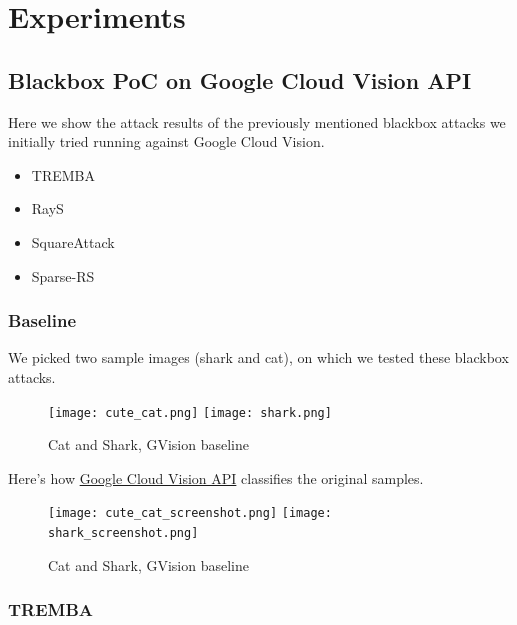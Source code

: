 \chapter{Experiments}
\label{experiments_chap}

\section{Blackbox PoC on Google Cloud Vision API}
Here we show the attack results of the previously mentioned blackbox attacks we initially tried running against Google Cloud Vision.

\begin{itemize}
    \item TREMBA
    \item RayS
    \item SquareAttack
    \item Sparse-RS
\end{itemize}

\subsection{Baseline}
We picked two sample images (shark and cat), on which we tested these blackbox attacks.

\begin{figure}[!htb]
\null\hspace{1cm}
  \texttt{[image: cute\_cat.png]}
\endminipage
\null\hspace{1cm}
  \texttt{[image: shark.png]}
\endminipage
\caption{Cat and Shark, GVision baseline}
\label{fig:cat_shark_original}
\end{figure}


Here's how \href{https://cloud.google.com/vision}{Google Cloud Vision API} classifies the original samples.

\begin{figure}[!htb]
  \texttt{[image: cute\_cat\_screenshot.png]}
\endminipage\hfill
{}
  \texttt{[image: shark\_screenshot.png]}
\endminipage\hfill
\caption{Cat and Shark, GVision baseline}
\label{fig:cat_shark_gvision_baseline}
\end{figure}


\subsection{TREMBA}
\label{tremba_poc}


